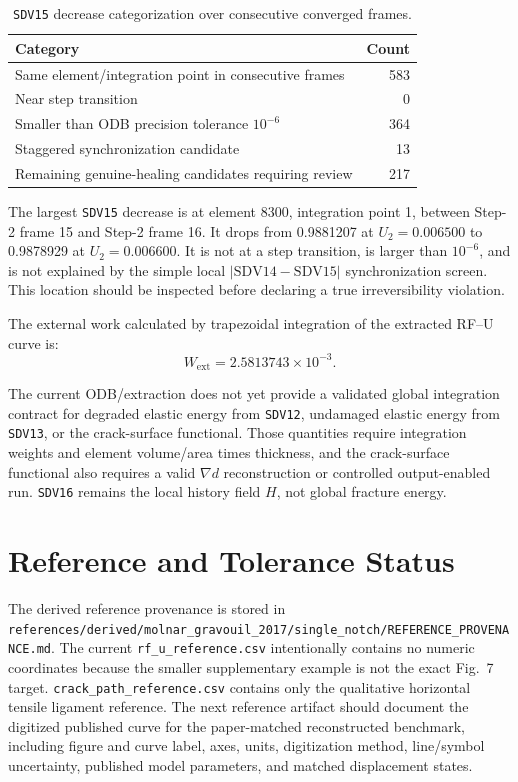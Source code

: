 \documentclass[11pt,a4paper]{article}
\begin{document}
\begin{table}[H]
\centering
\caption{\texttt{SDV15} decrease categorization over consecutive converged frames.}
\begin{tabular}{@{}lr@{}}
\toprule
Category & Count \\
\midrule
Same element/integration point in consecutive frames & 583 \\
Near step transition & 0 \\
Smaller than ODB precision tolerance \(10^{-6}\) & 364 \\
Staggered synchronization candidate & 13 \\
Remaining genuine-healing candidates requiring review & 217 \\
\bottomrule
\end{tabular}
\end{table}

The largest \texttt{SDV15} decrease is at element 8300, integration point 1, between Step-2 frame 15 and Step-2 frame 16. It drops from 0.9881207 at \(U_2=0.006500\) to 0.9878929 at \(U_2=0.006600\). It is not at a step transition, is larger than \(10^{-6}\), and is not explained by the simple local \(|\mathrm{SDV14}-\mathrm{SDV15}|\) synchronization screen. This location should be inspected before declaring a true irreversibility violation.

The external work calculated by trapezoidal integration of the extracted RF--U curve is:
\[
W_{\mathrm{ext}} = 2.5813743\times10^{-3}.
\]

The current ODB/extraction does not yet provide a validated global integration contract for degraded elastic energy from \texttt{SDV12}, undamaged elastic energy from \texttt{SDV13}, or the crack-surface functional. Those quantities require integration weights and element volume/area times thickness, and the crack-surface functional also requires a valid \(\nabla d\) reconstruction or controlled output-enabled run. \texttt{SDV16} remains the local history field \(H\), not global fracture energy.

\section{Reference and Tolerance Status}

The derived reference provenance is stored in \texttt{references/derived/molnar\_gravouil\_2017/single\_notch/REFERENCE\_PROVENANCE.md}. The current \texttt{rf\_u\_reference.csv} intentionally contains no numeric coordinates because the smaller supplementary example is not the exact Fig.~7 target. \texttt{crack\_path\_reference.csv} contains only the qualitative horizontal tensile ligament reference. The next reference artifact should document the digitized published curve for the paper-matched reconstructed benchmark, including figure and curve label, axes, units, digitization method, line/symbol uncertainty, published model parameters, and matched displacement states.
\end{document}
